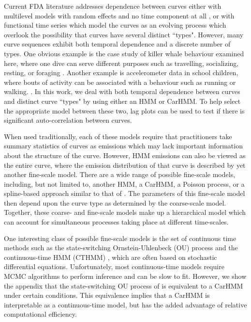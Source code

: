\iffalse

Current FDA literature addresses dependence between curves either with multilevel models with random effects and no time component at all \citep{Chen:2012,Di:2009}, or with functional time series which model the curves as an evolving process \citep{Kokoszka:2018} which overlook the possibility that curves have several distinct ``types". However, many curve sequences exhibit both temporal dependence and a discrete number of types. One obvious example is the case study of killer whale behaviour examined here, where one dive can serve different purposes such as travelling, socializing, resting, or foraging \citep{Tennessen:2019a}. Another example is accelerometer data in school children, where bouts of activity can be associated with a behaviour such as running or walking. \citep{Morris:2007}. In this work, we deal with both temporal dependence between curves and distinct curve ``types" by using either an HMM or CarHMM. To help select the appropriate model between these two, lag plots can be used to test if there is significant auto-correlation between curves.

When used traditionally, each of these models require that practitioners take summary statistics of curves as emissions which may lack important information about the structure of the curve. However, HMM emissions can also be viewed as the entire curve, where the emission distribution of that curve is described by yet another fine-scale model. There are a wide range of possible fine-scale models, including, but not limited to, another HMM, a CarHMM, a Poisson process, or a spline-based approach similar to that of \citet{Langrock:2018}. The parameters of this fine-scale model then depend upon the curve type as determined by the coarse-scale model. Together, these coarse- and fine-scale models make up a hierarchical model which can account for simultaneous processes taking place at different time-scales.

One interesting class of possible fine-scale models is the set of continuous time methods such as the state-switching Ornstein-Uhlenbeck (OU) process \citep{Michelot:2019} and the continuous-time HMM (CTHMM) \citep{Liu:2015}, which are often based on stochastic differential equations. Unfortunately, most continuous-time models require MCMC algorithms to perform inference and can be slow to fit. However, we show the appendix that the state-switching OU process of \citet{Michelot:2019} is equivalent to a CarHMM under certain conditions. This equivalence implies that a CarHMM is interpretable as a continuous-time model, but has the added advantage of relative computational efficiency.

